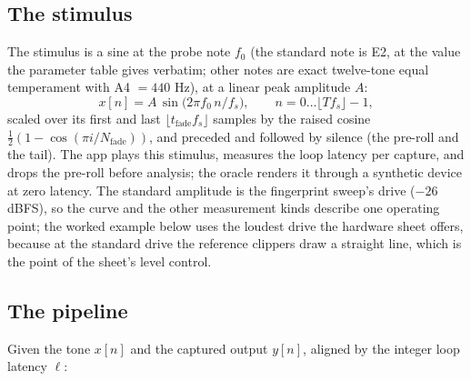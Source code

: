 \documentclass[11pt,a4paper]{article}
\begin{document}
\subsection{The stimulus}
\label{sec:transfer-stimulus}
The stimulus is a sine at the probe note $f_0$ (the standard note is E2, at
the value the parameter table gives verbatim; other notes are exact
twelve-tone equal temperament with A4 $= 440$ Hz), at a linear peak
amplitude $A$:
\begin{equation}
  x[n] = A\,\sin\!\big(2\pi f_0\, n / f_s\big),\qquad n = 0 \ldots \lfloor T f_s\rfloor - 1,
  \label{eq:tone}
\end{equation}
scaled over its first and last $\lfloor t_{\mathrm{fade}} f_s\rfloor$ samples
by the raised cosine $\tfrac12(1 - \cos(\pi i / N_{\mathrm{fade}}))$, and
preceded and followed by silence (the pre-roll and the tail). The app plays
this stimulus, measures the loop latency per capture, and drops the pre-roll
before analysis; the oracle renders it through a synthetic device at zero
latency. The standard amplitude is the fingerprint sweep's drive
($-26$ dBFS), so the curve and the other measurement kinds describe one
operating point; the worked example below uses the loudest drive the
hardware sheet offers, because at the standard drive the reference clippers
draw a straight line, which is the point of the sheet's level control.

\subsection{The pipeline}
\label{sec:transfer-pipeline}
Given the tone $x[n]$ and the captured output $y[n]$, aligned by the
integer loop latency $\ell$:
\end{document}

